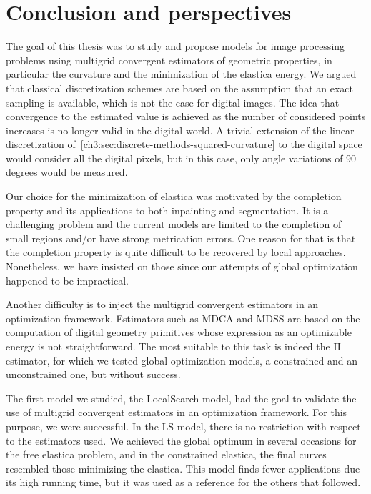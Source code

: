 \chapter{Conclusion and perspectives}
\label{chapter:conclusion-and-perspectives}

The goal of this thesis was to study and propose models for image processing problems using multigrid convergent estimators of geometric properties, in particular the curvature and the minimization of the elastica energy. We argued that classical discretization schemes are based on the assumption that an exact sampling is available, which is not the case for digital images. The idea that convergence to the estimated value is achieved as the number of considered points increases is no longer valid in the digital world. A trivial extension of the linear discretization of~\cref{ch3:sec:discrete-methods-squared-curvature} to the digital space would consider all the digital pixels, but in this case, only angle variations of $90$ degrees would be measured.

Our choice for the minimization of elastica was motivated by the completion property and its applications to both inpainting and segmentation. It is a challenging problem and the current models are limited to the completion of small regions and/or have strong metrication errors. One reason for that is that the completion property is quite difficult to be recovered by local approaches. Nonetheless, we have insisted on those since our attempts of global optimization happened to be impractical.

Another difficulty is to inject the multigrid convergent estimators in an optimization framework. Estimators such as MDCA and MDSS are based on the computation of digital geometry primitives whose expression as an optimizable energy is not straightforward. The most suitable to this task is indeed the II estimator, for which we tested global optimization models, a constrained and an unconstrained one, but without success.

The first model we studied, the LocalSearch model, had the goal to validate the use of  multigrid convergent estimators in an optimization framework. For this purpose, we were successful. In the LS model, there is no restriction with respect to the estimators used. We achieved the global optimum in several occasions for the free elastica problem, and in the constrained elastica, the final curves resembled those minimizing the elastica. This model finds fewer applications due its high running time, but it was used as a reference for the others that followed.

